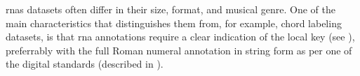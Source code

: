 
\glspl{rna} datasets often  differ in their size, format,
and musical genre. One of the main characteristics that
distinguishes them from, for example, chord labeling
datasets, is that \gls{rna} annotations require a clear
indication of the local key (see ),
preferrably with the full Roman numeral annotation in string
form as per one of the digital standards (described in
).
